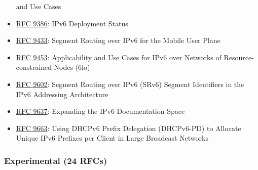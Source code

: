 \documentclass[
]{article}
\begin{document}
\begin{itemize}
  and Use Cases
\item
  \href{https://www.rfc-editor.org/info/rfc9386}{RFC 9386}: IPv6
  Deployment Status
\item
  \href{https://www.rfc-editor.org/info/rfc9433}{RFC 9433}: Segment
  Routing over IPv6 for the Mobile User Plane
\item
  \href{https://www.rfc-editor.org/info/rfc9453}{RFC 9453}:
  Applicability and Use Cases for IPv6 over Networks of
  Resource-constrained Nodes (6lo)
\item
  \href{https://www.rfc-editor.org/info/rfc9602}{RFC 9602}: Segment
  Routing over IPv6 (SRv6) Segment Identifiers in the IPv6 Addressing
  Architecture
\item
  \href{https://www.rfc-editor.org/info/rfc9637}{RFC 9637}: Expanding
  the IPv6 Documentation Space
\item
  \href{https://www.rfc-editor.org/info/rfc9663}{RFC 9663}: Using DHCPv6
  Prefix Delegation (DHCPv6-PD) to Allocate Unique IPv6 Prefixes per
  Client in Large Broadcast Networks
\end{itemize}

\subsubsection{Experimental (24 RFCs)}\label{experimental-24-rfcs}
\end{document}

